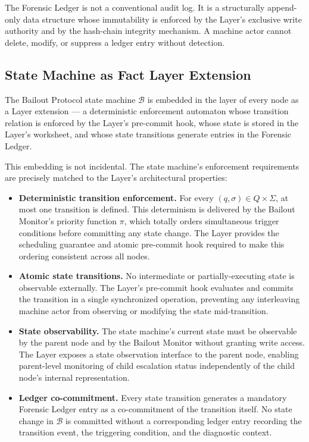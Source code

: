 The Forensic Ledger is not a conventional audit log.  It is a structurally
append-only data structure whose immutability is enforced by the \fact{} Layer's
exclusive write authority and by the hash-chain integrity mechanism.  A machine
actor cannot delete, modify, or suppress a ledger entry without detection.

\subsection{State Machine as Fact Layer Extension}\label{sec:state-machine-fact-layer}

The Bailout Protocol state machine $\mathcal{B}$ is embedded in the \fact{}
layer of every \bxthree{} node as a \fact{} Layer extension --- a deterministic
enforcement automaton whose transition relation is enforced by the \fact{} Layer's
pre-commit hook, whose state is stored in the \fact{} Layer's worksheet, and whose
state transitions generate entries in the Forensic Ledger.

This embedding is not incidental.  The state machine's enforcement requirements
are precisely matched to the \fact{} Layer's architectural properties:

\begin{itemize}\itemsep=0pt
\item[(\textit{i})] \textbf{Deterministic transition enforcement.}  For every
$(q,\sigma) \in Q \times \Sigma$, at most one transition is defined.  This
determinism is delivered by the Bailout Monitor's priority function $\pi$, which
totally orders simultaneous trigger conditions before committing any state
change.  The \fact{} Layer provides the scheduling guarantee and atomic
pre-commit hook required to make this ordering consistent across all nodes.

\item[(\textit{ii})] \textbf{Atomic state transitions.}  No intermediate or
partially-executing state is observable externally.  The \fact{} Layer's
pre-commit hook evaluates and commits the transition in a single synchronized
operation, preventing any interleaving machine actor from observing or modifying
the state mid-transition.

\item[(\textit{iii})] \textbf{State observability.}  The state machine's
current state must be observable by the parent node and by the Bailout Monitor
without granting write access.  The \fact{} Layer exposes a state observation
interface to the parent node, enabling parent-level monitoring of child
escalation status independently of the child node's internal representation.

\item[(\textit{iv})] \textbf{Ledger co-commitment.}  Every state transition
generates a mandatory Forensic Ledger entry as a co-commitment of the transition
itself.  No state change in $\mathcal{B}$ is committed without a corresponding
ledger entry recording the transition event, the triggering condition, and the
diagnostic context.
\end{itemize}

